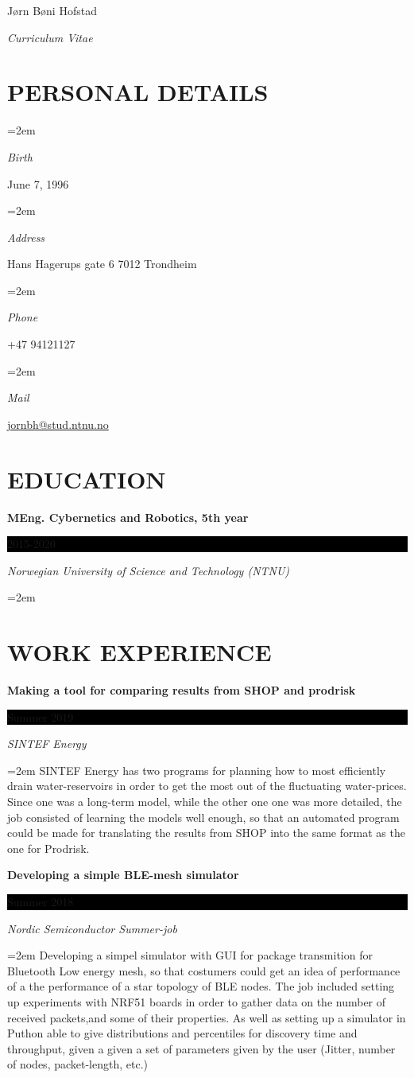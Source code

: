 \documentclass[paper=a4,fontsize=11pt,norsk]{scrartcl} %
\newlength{\spacebox}
\newcommand{\sepspace}{\vspace*{1em}}		%
\newcommand{\MyName}[1]{ %
		\Huge \usefont{OT1}{phv}{b}{n} \hfill #1
		\par \normalsize \normalfont}
\newcommand{\MySlogan}[1]{ %
		\large \usefont{OT1}{phv}{m}{n}\hfill \textit{#1}
		\par \normalsize \normalfont}
\newcommand{\NewPart}[1]{\section*{\uppercase{#1}}}
\newcommand{\PersonalEntry}[2]{
		\noindent\hangindent=2em\hangafter=0 %
		\parbox{\spacebox}{        %
		\textit{#1}}		       %
		\hspace{1.5em} #2 \par}    %
\newcommand{\EducationEntry}[4]{
		\noindent \textbf{#1} \hfill      %
		\colorbox{Black}{%
			\parbox{6em}{%
			\hfill\color{White}#2}} \par  %
		\noindent \textit{#3} \par        %
		\noindent\hangindent=2em\hangafter=0 \small #4 %
		\normalsize \par}
\begin{document}

\MyName{Jørn Bøni Hofstad}
\MySlogan{Curriculum Vitae}

\sepspace

\NewPart{Personal details}{}

\PersonalEntry{Birth}{June 7, 1996}
\PersonalEntry{Address}{Hans Hagerups gate 6 7012 Trondheim}
\PersonalEntry{Phone}{+47 94121127}
\PersonalEntry{Mail}{\url{jornbh@stud.ntnu.no}}

\NewPart{Education}{}

\EducationEntry{MEng. Cybernetics and Robotics, 5th year}{2015-2020}{Norwegian University of Science and Technology (NTNU)}{}
\sepspace

\NewPart{Work experience}{}
\EducationEntry{Making a tool for comparing results from SHOP and prodrisk}{Summer 2019}{SINTEF Energy}{
SINTEF Energy has two programs for planning how to most efficiently drain water-reservoirs in order to get the most out of the fluctuating water-prices. Since one was a long-term model, while the other one one was more detailed, the job consisted of learning the models well enough, so that an automated program could be made for translating the results from SHOP into the same format as the one for Prodrisk.  
}

\EducationEntry{Developing a simple BLE-mesh simulator}{Summer 2018}{Nordic Semiconductor Summer-job}{
Developing a simpel simulator with GUI for package transmition for Bluetooth Low energy mesh, so that costumers could get an idea of performance of a the performance of a star topology of BLE nodes. The job included setting up experiments with NRF51 boards in order to gather data on the number of received packets,and some of their properties. As well as setting up a simulator in Puthon able to give distributions and percentiles for discovery time and throughput, given a given a set of parameters given by the user (Jitter, number of nodes, packet-length, etc.) 

}
\end{document}

